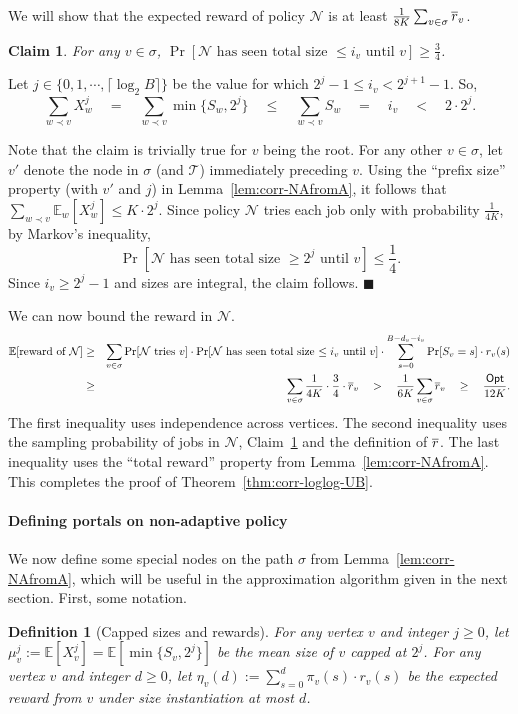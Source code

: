 \documentclass[11pt,letterpaper]{article}
\newtheorem{definition}[theorem]{Definition}
\newtheorem{claim}[theorem]{Claim}
\numberwithin{algorithm}{section}
\newenvironment{proof}{

\noindent{\bf Proof:}}
{\hfill$\blacksquare$


}
\newcommand{\N}[0]{{\ensuremath{\mathcal{N}}}\xspace}
\newcommand{\T}{\ensuremath{\mathcal{T}}\xspace}
\newcommand{\Opt}{\ensuremath{\mathsf{Opt}}\xspace}
\newcommand{\E}{\mathbb{E}}
\begin{document}
We will show that the expected reward of policy \N is at least $\frac{1}{8K}\sum_{v\in\sigma} \overline{r}_v$.

\begin{claim}\label{cl:corr-NA}
For any $v\in\sigma$, $\Pr\left[\N \mbox{ has seen total size $\le i_v$ until }v\right] \ge \frac34$.
\end{claim}
\begin{proof}
Let $j\in\{0,1,\cdots,\lceil \log_2B\rceil\}$ be the value for which $2^j-1\le i_v<2^{j+1}-1$. So,
$$\sum_{w\prec v} X^j_w \quad =\quad \sum_{w\prec v} \min\{S_w, 2^j\} \quad \le \quad \sum_{w\prec v} S_w \quad =\quad i_v \quad < \quad 2\cdot 2^j.$$

Note that the claim is trivially true for $v$ being the root. For any other $v\in \sigma$, let $v'$ denote the node in $\sigma$ (and \T) immediately preceding $v$.
Using the ``prefix size'' property  (with $v'$ and $j$) in Lemma~\ref{lem:corr-NAfromA}, it follows that $\sum_{w\prec v} \E_w\left[X^j_w\right] \le K\cdot 2^j$. Since policy \N tries each job only with probability $\frac{1}{4K}$,  by Markov's inequality,
$$\Pr\left[\N \mbox{ has seen total size $\ge 2^j$ until }v\right] \le \frac14.$$ Since $i_v\ge 2^j-1$ and sizes are integral, the claim follows.
\end{proof}
We can now bound the reward in \N.
\begin{eqnarray*}
\E[\mbox{reward of }\N] & \ge & \sum_{v\in \sigma} \Pr[\N \mbox{ tries }v]\cdot \Pr[\N \mbox{ has seen total size $\le i_v$ until }v]\cdot \sum_{s=0}^{B-d_v-i_v} \Pr[S_v=s]\cdot r_v(s) \\
&\ge & \sum_{v\in \sigma} \frac{1}{4K}\cdot \frac{3}{4}\cdot \rr_v \quad >\quad \frac{1}{6K}\sum_{v\in \sigma} \rr_v\quad \ge \quad  \frac{\Opt}{12K}.
\end{eqnarray*}
The first inequality uses independence across vertices. The second inequality uses the sampling probability of jobs in \N, Claim~\ref{cl:corr-NA} and the definition of $\overline{r}$. The last inequality uses the ``total reward'' property from Lemma~\ref{lem:corr-NAfromA}. This completes the proof of Theorem~\ref{thm:corr-loglog-UB}.

\paragraph{Defining portals on non-adaptive policy}
We now define some special nodes on the path $\sigma$ from Lemma~\ref{lem:corr-NAfromA}, which will be useful in the approximation algorithm given in the next section. First, some notation.
\begin{definition}[Capped sizes and rewards]\label{def:cap-size-rew}
For any vertex $v$ and integer $j\ge 0$, let $\mu^j_v:=\E[X^j_v]=\E\left[\min\{S_v,2^j\}\right]$ be the mean size of $v$ capped at $2^j$. For any vertex $v$ and integer $d\ge 0$, let $\eta_v(d):=\sum_{s=0}^d \pi_v(s)\cdot r_v(s)$ be the expected reward from $v$ under size instantiation at most $d$.
\end{definition}
\end{document}
